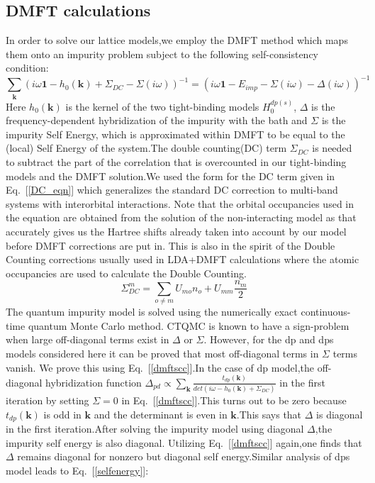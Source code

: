 \documentclass[10pt]{ruthesis}
\begin{document}
{\subsection{\label{DMFT}DMFT calculations}
In order to solve our lattice models,we employ the DMFT method which maps them onto an impurity problem subject to the following self-consistency condition\cite{RMP_DMFT_1996_A.G_G.K}:
\begin{equation}\label{dmftscc}
\sum_{\mathbf k}(i\omega\mathbf{1}-h_0(\mathbf k)+\Sigma_{DC}-\Sigma(i\omega))^{-1}=(i\omega\mathbf{1}-E_{imp}-\Sigma(i\omega)-\Delta(i\omega))^{-1}
\end{equation}
Here $h_0(\mathbf k)$ is the kernel of the two tight-binding models $H^{dp(s)}_0$, $\Delta$ is the frequency-dependent hybridization of the impurity with the bath and $\Sigma$ is the impurity Self Energy, which is approximated within DMFT to be equal to the (local) Self Energy of the system.The double counting(DC) term $\Sigma_{DC}$ is needed to subtract the part of the correlation that is overcounted  in our tight-binding models and the DMFT solution.We used the form for the DC term given in Eq.~[\ref{DC_eqn}] which generalizes the standard DC correction to multi-band systems with interorbital interactions\cite{JPCM_LDA+U_Doublecounting_1997_Anisimov}. Note that the orbital occupancies used in the equation are obtained from the solution of the non-interacting model as that accurately gives us the Hartree shifts already taken into account by our model before DMFT corrections are put in. This is also in the spirit of the Double Counting corrections usually used in LDA+DMFT calculations where the atomic occupancies are used to calculate the Double Counting.
\begin{equation}\label{DC_eqn}
\Sigma^m_{DC}=\sum_{o\neq m}U_{mo}n_o+U_{mm}\frac{n_m}{2}
\end{equation}
The quantum impurity model is solved using the numerically exact continuous-time quantum Monte Carlo method\cite{PRL_firstpaper_on_CTQMC_2006_P.Werner_A.J,PRB_CTQMC_2007_K.Haule}. CTQMC is known to have a sign-problem when large off-diagonal terms exist in $\Delta$ or $\Sigma$. However, for the dp and dps models considered here it can be proved that most off-diagonal terms in $\Sigma$ terms vanish. We prove this using Eq.~[\ref{dmftscc}].In the case of dp model,the off-diagonal hybridization function $\Delta_{pd}\propto\sum_{\mathbf k} \frac{t_{dp}(\mathbf k)}{det(i\omega-h_0(\mathbf k)+\Sigma_{DC})} $ in the first iteration by setting $\Sigma=0$ in Eq.~[\ref{dmftscc}].This turns out to be zero because $t_{dp}(\mathbf k)$ is odd in $\mathbf k$ and the determinant is even in $\mathbf k$.This says that $\Delta$ is diagonal in the first iteration.After solving the impurity model using diagonal $\Delta$,the impurity self energy is also diagonal. Utilizing Eq.~[\ref{dmftscc}] again,one finds that $\Delta$ remains diagonal for nonzero but diagonal self energy.Similar analysis of dps model leads to Eq.~[\ref{selfenergy}]:
}
\end{document}
